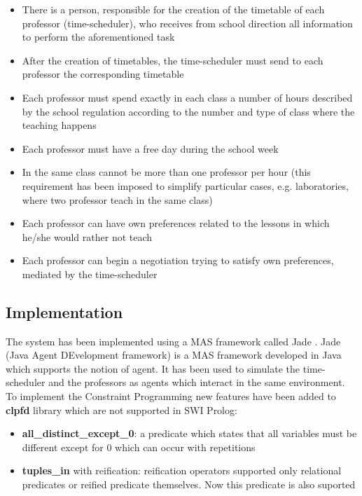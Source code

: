 \begin{itemize}
    \item There is a person, responsible for the creation of the timetable of each professor (time-scheduler), who receives from school direction all information to perform the aforementioned task
    \item After the creation of timetables, the time-scheduler must send to each professor the corresponding timetable
    \item Each professor must spend exactly in each class a number of hours described by the school regulation according to the number and type of class where the teaching happens
    \item Each professor must have a free day during the school week
    \item In the same class cannot be more than one professor per hour (this requirement has been imposed to simplify particular cases, e.g. laboratories, where two professor teach in the same class)
    \item Each professor can have own preferences related to the lessons in which he/she would rather not teach 
    \item Each professor can begin a negotiation trying to satisfy own preferences, mediated by the time-scheduler   
\end{itemize}

\subsection{Implementation}\label{subsec:implementation_case_study}
The system has been implemented using a MAS framework called Jade \cite{10.1007/3-540-44631-1_7}.
Jade (Java Agent DEvelopment framework) is a MAS framework developed in Java which supports the notion of agent. It has been used to simulate the time-scheduler and the professors as agents which interact in the same environment.\newline
To implement the Constraint Programming new features have been added to \textbf{clpfd} library which are not supported in SWI Prolog:
\begin{itemize}
    \item \textbf{all\_distinct\_except\_0}: a predicate which states that all variables must be different except for 0 which can occur with repetitions
    \item \textbf{tuples\_in} with reification: reification operators supported only relational predicates or reified predicate themselves. Now this predicate is also suported
\end{itemize}

